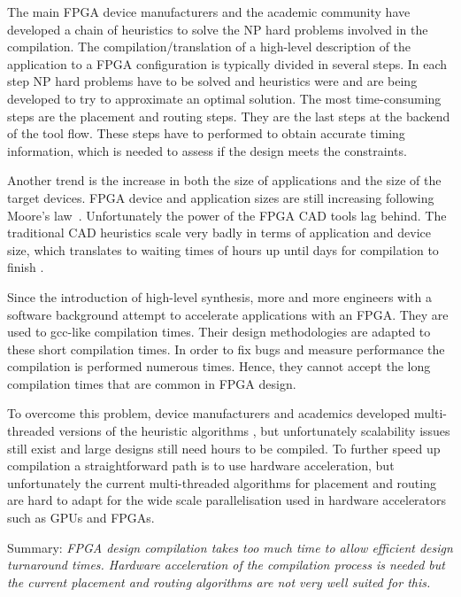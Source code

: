 \documentclass[a4paper,oneside,12pt]{article}
\begin{document}
The main FPGA device manufacturers and the academic community have developed a chain of heuristics to solve the NP hard problems involved in the compilation.
The compilation/translation of a high-level description of the application to a FPGA configuration is typically divided in several steps. In each step NP hard problems have to be solved and heuristics were and are being developed to try to approximate an optimal solution. The most time-consuming steps are the placement and routing steps. They are the last steps at the backend of the tool flow. These steps have to performed to obtain accurate timing information, which is needed to assess if the design meets the constraints. 
 
Another trend is the increase in both the size of applications and the size of the target devices. FPGA device and application sizes are still increasing following Moore's law~\cite{shannon2015technology}. Unfortunately the power of the FPGA CAD tools lag behind. The traditional CAD heuristics scale very badly in terms of application and device size, which translates to waiting times of hours up until days for compilation to finish \cite{murray2015timing}. 

Since the introduction of high-level synthesis\cite{}, more and more engineers with a software background attempt to accelerate applications with an FPGA. They are used to gcc-like compilation times. Their design methodologies are adapted to these short compilation times. In order to fix bugs and measure performance the compilation is performed numerous times. Hence, they cannot accept the long compilation times that are common in FPGA design.

To overcome this problem, device manufacturers and academics developed multi-threaded versions of the heuristic algorithms \cite{ludwin2011,gort2012,betz2013method,jain2014multi}, but unfortunately scalability issues still exist and large designs still need hours to be compiled. To further speed up compilation a straightforward path is to use hardware acceleration, but unfortunately the current multi-threaded algorithms for placement and routing are hard to adapt for the wide scale parallelisation used in hardware accelerators such as GPUs and FPGAs.

Summary: \emph{FPGA design compilation takes too much time to allow efficient design turnaround times. Hardware acceleration of the compilation process is needed but the current placement and routing algorithms are not very well suited for this.
} 
\end{document}
